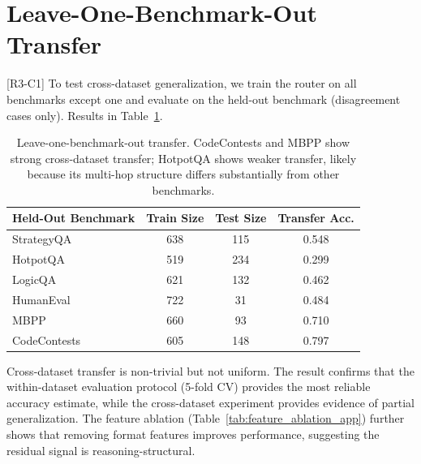 \documentclass[11pt]{article}
\begin{document}
{\color{reviewerpurple}
\section{Leave-One-Benchmark-Out Transfer}
\label{app:leave_one_out}

[R3-C1] To test cross-dataset generalization, we train the router on all benchmarks except one and evaluate on the held-out benchmark (disagreement cases only). Results in Table~\ref{tab:leave_one_out_app}.

\begin{table}[h]
\centering
\small
\begin{tabular}{lccc}
\toprule
\textbf{Held-Out Benchmark} & \textbf{Train Size} & \textbf{Test Size} & \textbf{Transfer Acc.} \\
\midrule
StrategyQA & 638 & 115 & 0.548 \\
HotpotQA & 519 & 234 & 0.299 \\
LogicQA & 621 & 132 & 0.462 \\
HumanEval & 722 & 31 & 0.484 \\
MBPP & 660 & 93 & 0.710 \\
CodeContests & 605 & 148 & 0.797 \\
\bottomrule
\end{tabular}
\caption{Leave-one-benchmark-out transfer. CodeContests and MBPP show strong cross-dataset transfer; HotpotQA shows weaker transfer, likely because its multi-hop structure differs substantially from other benchmarks.}
\label{tab:leave_one_out_app}
\end{table}

Cross-dataset transfer is non-trivial but not uniform. The result confirms that the within-dataset evaluation protocol (5-fold CV) provides the most reliable accuracy estimate, while the cross-dataset experiment provides evidence of partial generalization. The feature ablation (Table~\ref{tab:feature_ablation_app}) further shows that removing format features improves performance, suggesting the residual signal is reasoning-structural.
}
\end{document}
